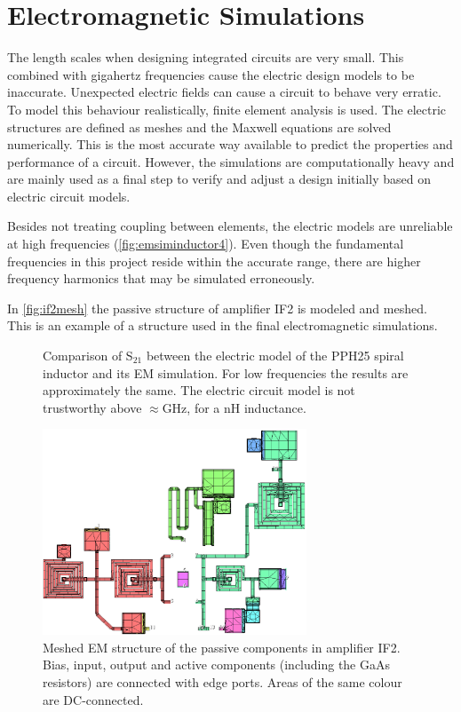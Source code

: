 \chapter{Electromagnetic Simulations}\label{app:emsim}
		The length scales when designing integrated circuits are very small. This combined with gigahertz frequencies cause the electric design models to be inaccurate. Unexpected electric fields can cause a circuit to behave very erratic. To model this behaviour realistically, finite element analysis is used. The electric structures are defined as meshes and the Maxwell equations are solved numerically. This is the most accurate way available to predict the properties and performance of a circuit. However, the simulations are computationally heavy and are mainly used as a final step to verify and adjust a design initially based on electric circuit models.

		Besides not treating coupling between elements, the electric models are unreliable at high frequencies (\autoref{fig:emsiminductor4}). Even though the fundamental frequencies in this project reside within the accurate range, there are higher frequency harmonics that may be simulated erroneously.

		In \autoref{fig:if2mesh} the passive structure of amplifier IF2 is modeled and meshed. This is an example of a structure used in the final electromagnetic simulations.

		\begin{figure}[hpt!]
			\centering
			\caption[EM simulation of the UMS PPH25 spiral inductor.]{Comparison of S$_{21}$ between the electric model of the PPH25 spiral inductor and its EM simulation. For low frequencies the results are approximately the same. The electric circuit model is not trustworthy above $\approx$\unit[12]{GHz}, for a \unit[4]{nH} inductance.}\label{fig:emsiminductor4}
		\end{figure}

		\begin{figure}[hpt!]
			\centering
			\includegraphics[width=0.7\textwidth]{fig/emsim/if2mesh}
			\caption[EM mesh of amplifier IF2.]{Meshed EM structure of the passive components in amplifier IF2. Bias, input, output and active components (including the GaAs resistors) are connected with edge ports. Areas of the same colour are DC-connected.}\label{fig:if2mesh}
		\end{figure}
